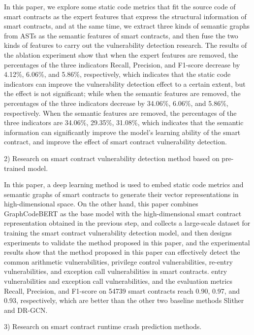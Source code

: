     In this paper, we explore some static code metrics that fit the source code of smart contracts as the expert features that express the structural information of smart contracts, and at the same time, we extract three kinds of semantic graphs from ASTs as the semantic features of smart contracts, and then fuse the two kinds of features to carry out the vulnerability detection research. The results of the ablation experiment show that when the expert features are removed, the percentages of the three indicators Recall, Precision, and F1-score decrease by 4.12\%, 6.06\%, and 5.86\%, respectively, which indicates that the static code indicators can improve the vulnerability detection effect to a certain extent, but the effect is not significant; while when the semantic features are removed, the percentages of the three indicators decrease by 34.06\%, 6.06\%, and 5.86\%, respectively. When the semantic features are removed, the percentages of the three indicators are 34.06\%, 29.35\%, 31.08\%, which indicates that the semantic information can significantly improve the model's learning ability of the smart contract, and improve the effect of smart contract vulnerability detection.

    2) Research on smart contract vulnerability detection method based on pre-trained model.
    
    In this paper, a deep learning method is used to embed static code metrics and semantic graphs of smart contracts to generate their vector representations in high-dimensional space. On the other hand, this paper combines GraphCodeBERT as the base model with the high-dimensional smart contract representation obtained in the previous step, and collects a large-scale dataset for training the smart contract vulnerability detection model, and then designs experiments to validate the method proposed in this paper, and the experimental results show that the method proposed in this paper can effectively detect the common arithmetic vulnerabilities, privilege control vulnerabilities, re-entry vulnerabilities, and exception call vulnerabilities in smart contracts. entry vulnerabilities and exception call vulnerabilities, and the evaluation metrics Recall, Precision, and F1-score on \num{54739} smart contracts reach 0.90, 0.97, and 0.93, respectively, which are better than the other two baseline methods Slither and DR-GCN.
    
    3) Research on smart contract runtime crash prediction methods.
    
